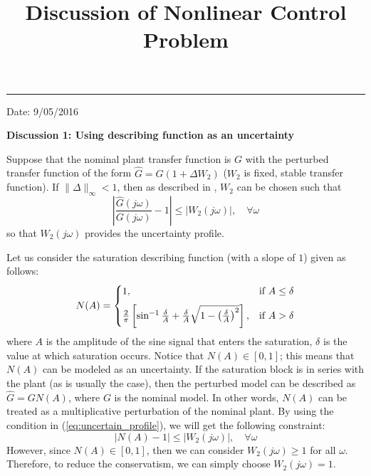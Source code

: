 \documentclass[12pt]{article}
\title{\LARGE \bf Discussion of Nonlinear Control Problem}
\begin{document}
\maketitle

\hrule
\begin{flushright}
Date: 9/05/2016
\end{flushright}
\textbf{Discussion 1: Using describing function as an uncertainty}

Suppose that the nominal plant transfer function is $G$ with the perturbed transfer function of the form $\hat{G} = G(1+\Delta W_2)$ ($W_2$ is fixed, stable transfer function). If $\| \Delta\|_{\infty}<1$, then as described in \cite{DFT92}, $W_2$ can be chosen such that
\begin{equation} \label{eq:uncertain_profile}
\left \lvert \frac{\hat{G}(j\omega)}{G(j\omega)} - 1 \right \rvert \leq |W_2(j\omega)|, \quad \forall \omega
\end{equation}
so that $W_2(j\omega)$ provides the uncertainty profile. 

Let us consider the saturation describing function (with a slope of $1$) given as follows:
\begin{equation}
N(A) = 
\begin{cases}
1, & \text{if }A \leq \delta \vspace{0.6em}\\
\frac{2}{\pi}\left[\sin^{-1}\frac{\delta }{A} + \frac{\delta }{A}\sqrt{1-\left(\frac{\delta }{A}\right)^2}\right], & \text{if }A>\delta 
\end{cases}
\end{equation}
where $A$ is the amplitude of the sine signal that enters the saturation, $\delta $ is the value at which saturation occurs. Notice that $N(A)\in [0,1]$; this means that $N(A)$ can be modeled as an uncertainty. If the saturation block is in series with the plant (as is usually the case), then the perturbed model can be described as $\hat{G} = GN(A)$, where $G$ is the nominal model. In other words, $N(A)$ can be treated as a multiplicative perturbation of the nominal plant. By using the condition in (\ref{eq:uncertain_profile}), we will get the following constraint:
\begin{equation}
|N(A)-1|\leq |W_2(j\omega)|, \quad \forall \omega
\end{equation}
However, since $N(A) \in [0,1]$, then we can consider $W_2(j\omega) \geq 1$ for all $\omega$. Therefore, to reduce the conservatism, we can simply choose $W_2(j\omega) = 1$. 
\end{document}
